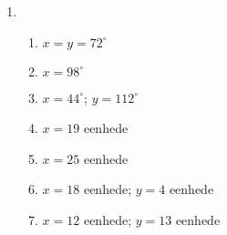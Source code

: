 {\begin{multicols}{3}
\begin{enumerate}[noitemsep, label=\textbf{\arabic*}. ]
\item %
      \begin{enumerate}[noitemsep, label=\textbf{(\alph*)} ]
\item $x=y=72^{\circ}$
\item $x=98^{\circ}$
\item $x=44^{\circ}$; $y=112^{\circ}$
\item $x=19$ eenhede
\item $x=25$ eenhede
\item $x=18$ eenhede; $y=4$ eenhede
\item $x=12$ eenhede; $y=13$ eenhede
      \end{enumerate}

\end{enumerate}


% 
% 



\end{multicols}}
